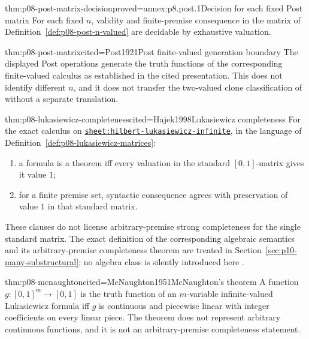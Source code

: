 \begin{hblemma}{thm:p08-post-matrix-decision}{proved=annex:p8.post.1}{Decision for each fixed Post matrix}
For each fixed \(n\), validity and finite-premise consequence in the matrix of
Definition~\ref{def:p08-post-n-valued} are decidable by exhaustive valuation.
\end{hblemma}

\begin{hbtheorem}{thm:p08-post-matrix}{cited=Post1921}{Post finite-valued generation boundary}
The displayed Post operations generate the truth functions of the corresponding
finite-valued calculus as established in the cited presentation.  This does
not identify different \(n\), and it does not transfer the two-valued clone
classification of \cite{Post1941} without a separate translation.
\end{hbtheorem}

\begin{hbtheorem}{thm:p08-lukasiewicz-completeness}{cited=Hajek1998}{Lukasiewicz completeness}
For the exact calculus on
\hyperref[sheet:hilbert-lukasiewicz-infinite]{\texttt{sheet:hilbert-lukasiewicz-infinite}}, in the language of
Definition~\ref{def:p08-lukasiewicz-matrices}:
\begin{enumerate}
  \item a formula is a theorem iff every valuation in the standard
        \([0,1]\)-matrix gives it value \(1\);
  \item for a finite premise set, syntactic consequence agrees with preservation
        of value \(1\) in that standard matrix.
\end{enumerate}
These clauses do not license arbitrary-premise strong completeness for the
single standard matrix.  The exact definition of the corresponding algebraic
semantics and its arbitrary-premise completeness theorem are treated in
Section~\ref{sec:p10-many-substructural}; no algebra class is silently introduced
here \cite{CignoliDOttavianoMundici2000}.
\end{hbtheorem}

\begin{hbtheorem}{thm:p08-mcnaughton}{cited=McNaughton1951}{McNaughton's theorem}
A function \(g:[0,1]^m\to[0,1]\) is the truth function of an
\(m\)-variable infinite-valued Lukasiewicz formula iff \(g\) is continuous and
piecewise linear with integer coefficients on every linear piece.  The theorem
does not represent arbitrary continuous functions, and it is not an
arbitrary-premise completeness statement.
\end{hbtheorem}


